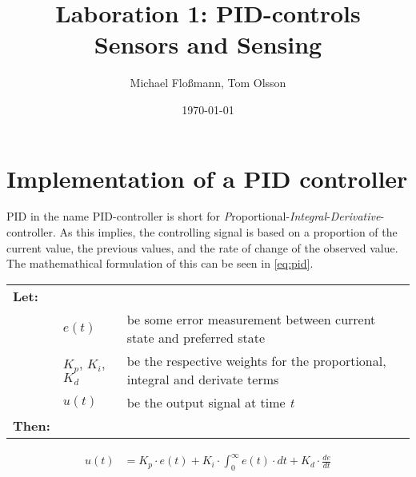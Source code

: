 \documentclass[11pt]{article}
\title{Laboration 1: PID-controls\\ {\small Sensors and Sensing}}
\author{Michael Flo{\ss}mann, Tom Olsson}
\date{\today}
\begin{document}
\maketitle %
\listoffigures %
\lstlistoflistings %
\lstset{ matchrangestart=t} %

\section{Implementation of a PID controller}
PID in the name PID-controller is short for \emph{P}roportional-\emph{Integral}-\emph{Derivative}-controller. As this implies, the controlling signal is based on a proportion of the current value, the previous values, and the rate of change of the observed value. The mathemathical formulation of this can be seen in \vref{eq:pid}.\par \vspace{10pt}
{\footnotesize
  \begin{tabular}{l l l}
    \textbf{Let:} \\
 &$e(t)$ &be some error measurement between current state and preferred state\\
 &$K_p$, $K_i$, $K_d$ &be the respective weights for the proportional, integral and derivate terms \\
 &$u(t)$ &be the output signal at time \emph{t} \\
    \textbf{Then:}
  \end{tabular}
  \begin{align}
    u(t) &= K_p\cdot e(t) + K_i \cdot\int_{0}^{\infty}e(t)\cdot dt + K_d \cdot \frac{de}{dt}\label{eq:pid}
  \end{align}}
\par
\end{document}

